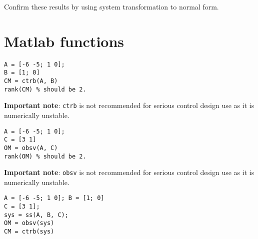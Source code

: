 Confirm these results by using system transformation to normal form.



 




\section*{Matlab functions} %
\label{sec:matlab_functions}

\begin{slide}
\begin{verbatim}
A = [-6 -5; 1 0];
B = [1; 0]
CM = ctrb(A, B)
rank(CM) % should be 2.
\end{verbatim}
\textbf{Important note}: \texttt{ctrb} is not recommended for serious control design use as it is numerically unstable.
\end{slide}

\begin{slide}
\begin{verbatim}
A = [-6 -5; 1 0];
C = [3 1]
OM = obsv(A, C)
rank(OM) % should be 2.
\end{verbatim}
\textbf{Important note}: \texttt{obsv} is not recommended for serious control design use as it is numerically unstable.
\end{slide}

\begin{slide}
\begin{verbatim}
A = [-6 -5; 1 0]; B = [1; 0]
C = [3 1];
sys = ss(A, B, C);
OM = obsv(sys)
CM = ctrb(sys)
\end{verbatim}
\end{slide}






\endinput

